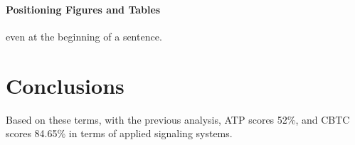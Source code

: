 \documentclass[conference]{IEEEtran}
\begin{document}



\paragraph{Positioning Figures and Tables} 
even at the beginning of a sentence.









\section{Conclusions}

 Based on these terms, with the previous analysis, ATP scores 52\%, and CBTC scores 84.65\% in terms of applied signaling systems.
\end{document}
